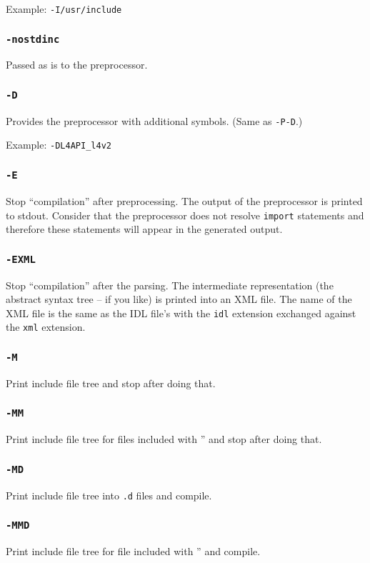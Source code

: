 Example: \verb|-I/usr/include|

\subsubsection{{\tt -nostdinc}}
Passed as is to the preprocessor.

\subsubsection{{\tt -D}}
Provides the preprocessor with additional symbols. (Same as
{\tt -P-D}.)

Example: \verb|-DL4API_l4v2|

\subsubsection{{\tt -E}}
Stop ``compilation'' after preprocessing. The output of the 
preprocessor is printed to stdout. Consider that the preprocessor
does not resolve \verb|import| statements and therefore these
statements will appear in the generated output.

\subsubsection{{\tt -EXML}}
Stop ``compilation'' after the parsing. The intermediate representation
(the abstract syntax tree -- if you like) is printed into an XML file. 
The name of the XML file is the same as the IDL file's with the \verb|idl|
extension exchanged against the \verb|xml| extension.

\subsubsection{{\tt -M}}
Print include file tree and stop after doing that.

\subsubsection{{\tt -MM}}
Print include file tree for files included with '' and stop
after doing that.

\subsubsection{{\tt -MD}}
Print include file tree into \verb|.d| files and compile.

\subsubsection{{\tt -MMD}}
Print include file tree for file included with '' and compile.


